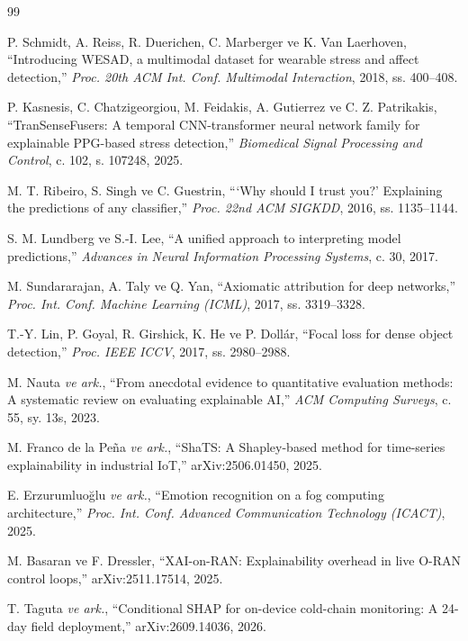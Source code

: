 \documentclass[conference]{IEEEtran}
\begin{document}
\begin{thebibliography}{99}
\small

P. Schmidt, A. Reiss, R. Duerichen, C. Marberger ve K. Van Laerhoven,
``Introducing WESAD, a multimodal dataset for wearable stress and affect
detection,'' \emph{Proc. 20th ACM Int. Conf. Multimodal Interaction}, 2018,
ss. 400--408.

P. Kasnesis, C. Chatzigeorgiou, M. Feidakis, A. Gutierrez ve C. Z. Patrikakis,
``TranSenseFusers: A temporal CNN-transformer neural network family for
explainable PPG-based stress detection,'' \emph{Biomedical Signal Processing
and Control}, c. 102, s. 107248, 2025.

M. T. Ribeiro, S. Singh ve C. Guestrin, ```Why should I trust you?' Explaining
the predictions of any classifier,'' \emph{Proc. 22nd ACM SIGKDD}, 2016,
ss. 1135--1144.

S. M. Lundberg ve S.-I. Lee, ``A unified approach to interpreting model
predictions,'' \emph{Advances in Neural Information Processing Systems}, c. 30,
2017.

M. Sundararajan, A. Taly ve Q. Yan, ``Axiomatic attribution for deep networks,''
\emph{Proc. Int. Conf. Machine Learning (ICML)}, 2017, ss. 3319--3328.

T.-Y. Lin, P. Goyal, R. Girshick, K. He ve P. Dollár, ``Focal loss for dense
object detection,'' \emph{Proc. IEEE ICCV}, 2017, ss. 2980--2988.

M. Nauta \emph{ve ark.}, ``From anecdotal evidence to quantitative evaluation
methods: A systematic review on evaluating explainable AI,'' \emph{ACM Computing
Surveys}, c. 55, sy. 13s, 2023.

M. Franco de la Peña \emph{ve ark.}, ``ShaTS: A Shapley-based method for
time-series explainability in industrial IoT,'' arXiv:2506.01450, 2025.

E. Erzurumluoğlu \emph{ve ark.}, ``Emotion recognition on a fog computing
architecture,'' \emph{Proc. Int. Conf. Advanced Communication Technology
(ICACT)}, 2025.

M. Basaran ve F. Dressler, ``XAI-on-RAN: Explainability overhead in live O-RAN
control loops,'' arXiv:2511.17514, 2025.

T. Taguta \emph{ve ark.}, ``Conditional SHAP for on-device cold-chain
monitoring: A 24-day field deployment,'' arXiv:2609.14036, 2026.


\end{thebibliography}
\end{document}
